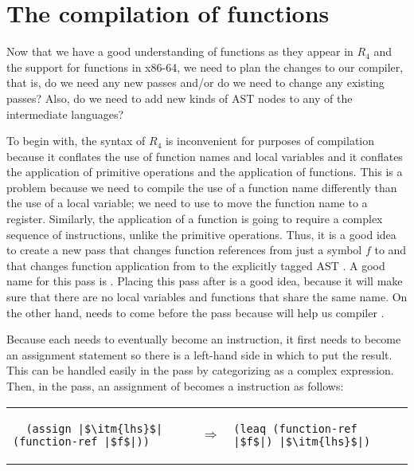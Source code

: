 \documentclass[11pt]{book}
\begin{document}
\section{The compilation of functions}

Now that we have a good understanding of functions as they appear in
$R_4$ and the support for functions in x86-64, we need to plan the
changes to our compiler, that is, do we need any new passes and/or do
we need to change any existing passes? Also, do we need to add new
kinds of AST nodes to any of the intermediate languages?

To begin with, the syntax of $R_4$ is inconvenient for purposes of
compilation because it conflates the use of function names and local
variables and it conflates the application of primitive operations and
the application of functions. This is a problem because we need to
compile the use of a function name differently than the use of a local
variable; we need to use  to move the function name to a
register. Similarly, the application of a function is going to require
a complex sequence of instructions, unlike the primitive
operations. Thus, it is a good idea to create a new pass that changes
function references from just a symbol $f$ to  and that changes function application from  to the explicitly tagged AST . A good name for this pass is
. Placing this pass after  is a
good idea, because it will make sure that there are no local variables
and functions that share the same name. On the other hand,
 needs to come before the  pass
because  will help us compiler .

Because each  needs to eventually become an
 instruction, it first needs to become an assignment
statement so there is a left-hand side in which to put the
result. This can be handled easily in the  pass by
categorizing  as a complex expression.  Then, in
the  pass, an assignment of
 becomes a  instruction as follows: \\
\begin{tabular}{lll}
\begin{minipage}{0.45\textwidth}
\begin{lstlisting}
  (assign |$\itm{lhs}$| (function-ref |$f$|))
\end{lstlisting}
\end{minipage}
&
$\Rightarrow$
&
\begin{minipage}{0.4\textwidth}
\begin{lstlisting}
(leaq (function-ref |$f$|) |$\itm{lhs}$|)
\end{lstlisting}
\end{minipage}
\end{tabular} 
\end{document}
